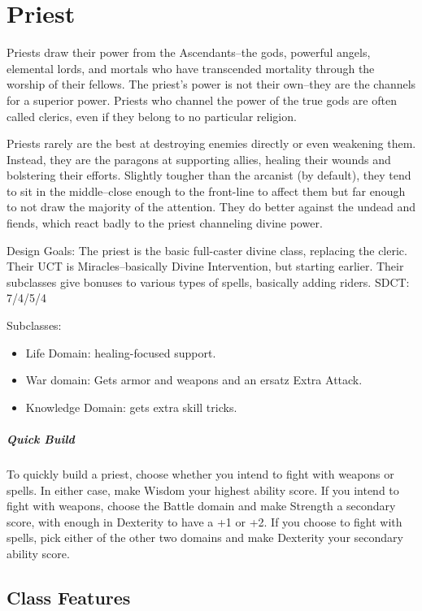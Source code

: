 \section{Priest\label{class:priest}}

Priests draw their power from the Ascendants--the gods, powerful angels, elemental lords, and mortals who have transcended mortality through the worship of their fellows. The priest's power is not their own--they are the channels for a superior power. Priests who channel the power of the true gods are often called clerics, even if they belong to no particular religion.

Priests rarely are the best at destroying enemies directly or even weakening them. Instead, they are the paragons at supporting allies, healing their wounds and bolstering their efforts. Slightly tougher than the arcanist (by default), they tend to sit in the middle--close enough to the front-line to affect them but far enough to not draw the majority of the attention. They do better against the undead and fiends, which react badly to the priest channeling divine power.

Design Goals: The priest is the basic full-caster divine class, replacing the cleric. Their UCT is Miracles--basically Divine Intervention, but starting earlier. Their subclasses give bonuses to various types of spells, basically adding riders. SDCT: 7/4/5/4

Subclasses:
\begin{itemize}
	\item Life Domain: healing-focused support.
	\item War domain: Gets armor and weapons and an ersatz Extra Attack.
	\item Knowledge Domain: gets extra skill tricks.
\end{itemize}

\subparagraph*{Quick Build}
To quickly build a priest, choose whether you intend to fight with weapons or spells. In either case, make Wisdom your highest ability score. If you intend to fight with weapons, choose the Battle domain and make Strength a secondary score, with enough in Dexterity to have a +1 or +2. If you choose to fight with spells, pick either of the other two domains and make Dexterity your secondary ability score.

\subsection{Class Features}

